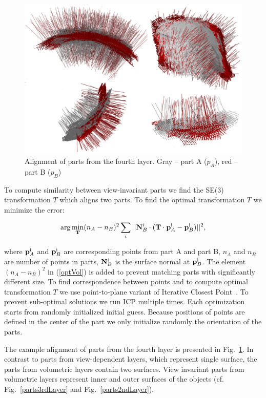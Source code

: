 \documentclass[letterpaper,10pt,conference]{ieeeconf}  %
\begin{document}
\begin{figure}[t]
 \centering
\includegraphics[width=0.95\columnwidth]{../images/viParts.eps}
\caption{Alignment of parts from the fourth layer. Gray -- part A ($p_A$), red -- part B ($p_B$)}
 \label{viParts}
\end{figure}

To compute similarity between view-invariant parts we find the SE(3) transformation $T$ which aligns two parts. To find the optimal transformation $T$ we minimize the error:

\begin{equation}
\label{optVol}
 \arg\min_{\bf T} (n_A-n_B)^2 \sum_i ||{\bf N}_B^i \cdot ({\bf T}\cdot {\bf p}_A^{\rm i}-{\bf p}_B^{\rm i})||^2,
\end{equation}

where ${\bf p}_A^{\rm i}$ and ${\bf p}_B^{\rm i}$ are corresponding points from part A and part B, $n_A$ and $n_B$ are number of points in parts, ${\bf N}_B^i$ is the surface normal at ${\bf p}_B^{\rm i}$. The element $(n_A-n_B)^2$ in (\ref{optVol}) is added to prevent matching parts with significantly different size. To find correspondence between points and to compute optimal transformation $T$ we use point-to-plane variant of Iterative Closest Point~\cite{Segal2009}. To prevent sub-optimal solutions we run ICP multiple times. Each optimization starts from randomly initialized initial guess. Because positions of points are defined in the center of the part we only initialize randomly the orientation of the parts. 

The example alignment of parts from the fourth layer is presented in Fig.~\ref{viParts}. In contrast to parts from view-dependent layers, which represent single surface, the parts from volumetric layers contain two surfaces. View invariant parts from volumetric layers represent inner and outer surfaces of the objects (cf. Fig.~\ref{parts3rdLayer} and Fig.~\ref{parts2ndLayer}).
\end{document}
